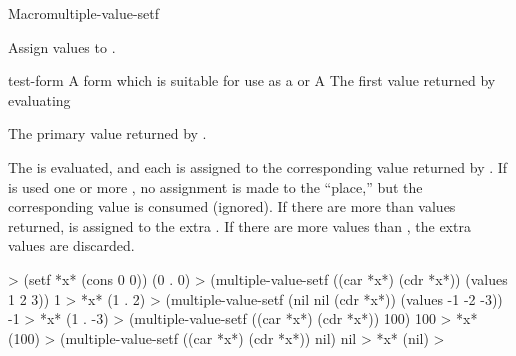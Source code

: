 \documentclass[10pt,twoside,english,pdftex]{article}
\begin{document}
\begin{functiondoc}{Macro}{multiple-value-setf}{%
  
 \returns{} } 
  
\fnsyntax

\fnpurpose Assign values to .

\fnpackage {}

\fnmodule {}

\fnargs
\begin{args}{test-form}
\arg[place] A form which is suitable for use as a
   or \nil 
\arg[form] A 
 The first value returned by evaluating 
\end{args}

\fnreturns The primary value returned by .

\fndescription
% 
The  is evaluated, and each  is assigned to the
corresponding value returned by .  If \nil{} is used one or more
, no assignment is made to the \nil{} ``place,'' but the
corresponding value is consumed (ignored). If there are more 
than values returned, \nil{} is assigned to the extra . If there
are more values than , the extra values are discarded.

\fnexamples
%
\W\supp
\begin{example}
  > (setf *x* (cons 0 0))
  (0 . 0)
  > (multiple-value-setf ((car *x*) (cdr *x*)) (values 1 2 3))
  1
  > *x*
  (1 . 2)\goodpagebreak
  > (multiple-value-setf (nil nil (cdr *x*)) (values -1 -2 -3))
  -1
  > *x*
  (1 . -3)\goodpagebreak
  > (multiple-value-setf ((car *x*) (cdr *x*)) 100)
  100
  > *x*
  (100)\goodpagebreak
  > (multiple-value-setf ((car *x*) (cdr *x*)) nil)
  nil
  > *x*
  (nil)\goodpagebreak
>
\end{example}

\end{functiondoc}

\end{document}
